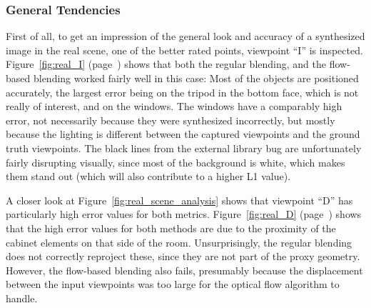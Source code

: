 \subsubsection{General Tendencies}
First of all, to get an impression of the general look and accuracy of a synthesized image in the real scene, one of the better rated points, viewpoint ``I'' is inspected. Figure~\ref{fig:real_I} (page~\pageref{fig:real_I}) shows that both the regular blending, and the flow-based blending worked fairly well in this case: Most of the objects are positioned accurately, the largest error being on the tripod in the bottom face, which is not really of interest, and on the windows. The windows have a comparably high error, not necessarily because they were synthesized incorrectly, but mostly because the lighting is different between the captured viewpoints and the ground truth viewpoints\footnotemark. The black lines from the external library bug are unfortunately fairly disrupting visually, since most of the background is white, which makes them stand out (which will also contribute to a higher L1 value).

A closer look at Figure~\ref{fig:real_scene_analysis} shows that viewpoint ``D'' has particularly high error values for both metrics. Figure~\ref{fig:real_D} (page~\pageref{fig:real_D}) shows that the high error values for both methods are due to the proximity of the cabinet elements on that side of the room. Unsurprisingly, the regular blending does not correctly reproject these, since they are not part of the proxy geometry. However, the flow-based blending also fails, presumably because the displacement between the input viewpoints was too large for the optical flow algorithm to handle.


